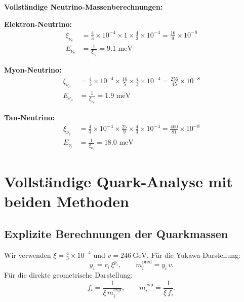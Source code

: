 	\textbf{Vollständige Neutrino-Massenberechnungen:}
	
	\textbf{Elektron-Neutrino:}
	\begin{align}
		\xi_{\nu_e} &= \frac{4}{3} \times 10^{-4} \times 1 \times \frac{4}{3} \times 10^{-4} = \frac{16}{9} \times 10^{-8} \\
		E_{\nu_e} &= \frac{1}{\xi_{\nu_e}} = 9.1 \text{ meV}
	\end{align}
	
	\textbf{Myon-Neutrino:}
	\begin{align}
		\xi_{\nu_\mu} &= \frac{4}{3} \times 10^{-4} \times \frac{16}{5} \times \frac{4}{3} \times 10^{-4} = \frac{256}{45} \times 10^{-8} \\
		E_{\nu_\mu} &= \frac{1}{\xi_{\nu_\mu}} = 1.9 \text{ meV}
	\end{align}
	
	\textbf{Tau-Neutrino:}
	\begin{align}
		\xi_{\nu_\tau} &= \frac{4}{3} \times 10^{-4} \times \frac{25}{9} \times \frac{4}{3} \times 10^{-4} = \frac{400}{81} \times 10^{-8} \\
		E_{\nu_\tau} &= \frac{1}{\xi_{\nu_\tau}} = 18.0 \text{ meV}
	\end{align}
	
	\section{Vollständige Quark-Analyse mit beiden Methoden}
	\label{sec:quark_analyse}
	
	\subsection{Explizite Berechnungen der Quarkmassen}
	\label{subsec:quark_calculations}
	
	Wir verwenden $\xi=\tfrac{4}{3}\times10^{-4}$ und $v=246\ \mathrm{GeV}$.
	Für die Yukawa-Darstellung:
	\[
	y_i = r_i\,\xi^{p_i},\qquad m_i^{\text{pred}}=y_i\,v.
	\]
	Für die direkte geometrische Darstellung:
	\[
	f_i=\frac{1}{\xi\, m_i^{\text{exp}}},\qquad m_i^{\text{exp}}=\frac{1}{\xi\, f_i}.
	\]
	

